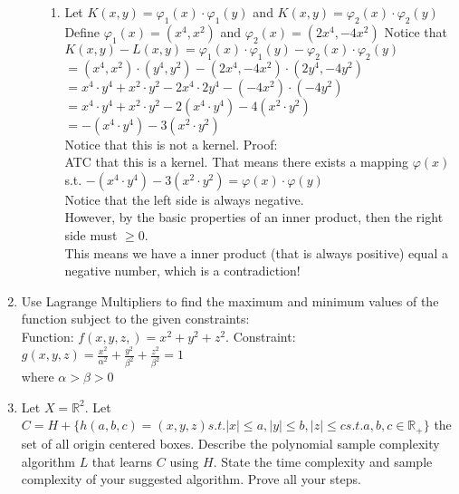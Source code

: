 \documentclass[12pt]{article}
\begin{document}
\begin{enumerate}
\begin{enumerate}
{\begin{enumerate}
			$ = 3(x \cdot y) + 15(x^2 \cdot y^2) $ \\
			$ = 3x \cdot 3y + 15x^2 \cdot 15y^2 $ \\
			This is a kernel with the mapping $ \varphi(x) = (3x, 15x) $.
			\item Let $K(x,y) = \varphi_1(x)\cdot\varphi_1(y)$ and $K(x,y) = \varphi_2(x)\cdot\varphi_2(y)$ \\
			Define $\varphi_1(x) = (x^4, x^2)$ and $\varphi_2(x) = (2x^4, -4x^2) $
			Notice that $ K(x,y) - L(x,y) = \varphi_1(x)\cdot\varphi_1(y) - \varphi_2(x)\cdot\varphi_2(y) $ \\
			$ = (x^4, x^2)\cdot(y^4,y^2) - (2x^4, -4x^2)\cdot(2y^4, -4y^2) $ \\
			$ = x^4 \cdot y^4 + x^2 \cdot y^2 - 2x^4 \cdot 2y^4 - (-4x^2) \cdot (-4y^2) $ \\
			$ = x^4 \cdot y^4 + x^2 \cdot y^2 - 2(x^4 \cdot y^4) - 4(x^2 \cdot y^2) $ \\
			$ = -(x^4 \cdot y^4) - 3(x^2 \cdot y^2) $ \\
			Notice that this is not a kernel. Proof: \\
			ATC that this is a kernel. That means there exists a mapping $\varphi(x)$ \\
			s.t. $ -(x^4 \cdot y^4) - 3(x^2 \cdot y^2) = \varphi(x) \cdot \varphi(y) $ \\
			Notice that the left side is always negative. \\
			However, by the basic properties of an inner product, then the right side must  $ \geq 0 $. \\
			This means we have a inner product (that is always positive) equal a negative number, which is a contradiction!
		\end{enumerate}
		}
	\end{enumerate}
	\item Use Lagrange Multipliers to find the maximum and minimum values of the function subject to the given constraints: \\
	Function: $f(x,y,z,) = x^2 + y^2 + z^2$. Constraint: $g(x,y,z) = \frac{x^2}{\alpha^2} + \frac{y^2}{\beta^2} + \frac{z^2}{\beta^2} = 1$ \\
	where $ \alpha > \beta > 0$
	\item Let $X = \mathbb{R}^2$. Let $ C = H + \{h(a,b,c) = {(x,y,z) s.t. |x| \leq a, |y| \leq b, |z| \leq c} s.t. a,b,c \in \mathbb{R}_+\}$ the set of all origin centered boxes. Describe the polynomial sample complexity algorithm $L$ that learns $C$ using $H$. State the time complexity and sample complexity of your suggested algorithm. Prove all your steps.
\end{enumerate}
\end{document}
